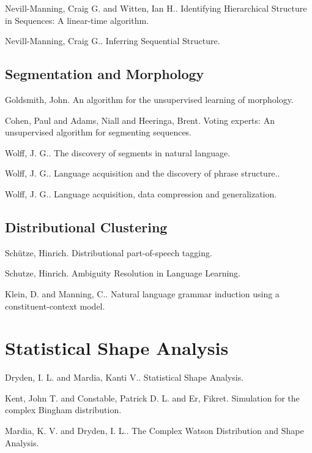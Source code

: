 \documentclass{article}
\begin{document}
\item Nevill-Manning, Craig G. and Witten, Ian H.. Identifying Hierarchical Structure in Sequences: A linear-time algorithm. \cite{NevillManning1997Identifying} \item Nevill-Manning, Craig G.. Inferring Sequential Structure. \cite{NevillManning1996Inferring} 
\eitem

\subsection{ Segmentation and Morphology} 

\bitem
\item Goldsmith, John. An algorithm for the unsupervised learning of morphology. \cite{Goldsmith2006Algorithm} \item Cohen, Paul and Adams, Niall and Heeringa, Brent. Voting experts: An unsupervised algorithm for segmenting sequences. \cite{Cohen2007Voting} \item Wolff, J. G.. The discovery of segments in natural language. \cite{Wolff1977Discovery} \item Wolff, J. G.. Language acquisition and the discovery of phrase structure.. \cite{Wolff1980Language} \item Wolff, J. G.. Language acquisition, data compression and generalization. \cite{Wolff1982Language} 
\eitem

\subsection{ Distributional Clustering} 

\bitem
\item Sch\"{u}tze, Hinrich. Distributional part-of-speech tagging. \cite{Schutze1995Distributional} \item Schutze, Hinrich. Ambiguity Resolution in Language Learning. \cite{Schutze1997Ambiguity} \item Klein, D. and Manning, C.. Natural language grammar induction using a constituent-context model. \cite{Klein2002Natural} 
\eitem

\section{ Statistical Shape Analysis} 

\bitem
\item Dryden, I. L. and Mardia, Kanti V.. Statistical Shape Analysis. \cite{Dryden1998Statistical} \item Kent, John T. and Constable, Patrick D. L. and Er, Fikret. Simulation for the complex Bingham distribution. \cite{Kent2004Simulation} \item Mardia, K. V. and Dryden, I. L.. The Complex Watson Distribution and Shape Analysis. \cite{Mardia1999Complex} 
\eitem
\end{document}

